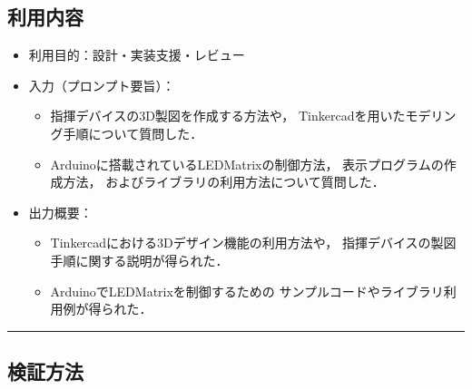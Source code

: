 \documentclass[uplatex,dvipdfmx,a4paper,11pt]{jsarticle}
\newcommand{\sectionrule}{\par\medskip\noindent\rule{\linewidth}{0.6pt}\par\medskip}
\begin{document}
\subsection{利用内容}

\begin{itemize}
  \item 利用目的：設計・実装支援・レビュー

  \item 入力（プロンプト要旨）：
    \begin{itemize}
      \item 指揮デバイスの3D製図を作成する方法や，
      Tinkercadを用いたモデリング手順について質問した．
      
      \item Arduinoに搭載されているLEDMatrixの制御方法，
      表示プログラムの作成方法，
      およびライブラリの利用方法について質問した．
     
    \end{itemize}

  \item 出力概要：
    \begin{itemize}
      \item Tinkercadにおける3Dデザイン機能の利用方法や，
      指揮デバイスの製図手順に関する説明が得られた．
      
      \item ArduinoでLEDMatrixを制御するための
      サンプルコードやライブラリ利用例が得られた．
      
    
    \end{itemize}
\end{itemize}


\sectionrule

\subsection{検証方法}
\end{document}
